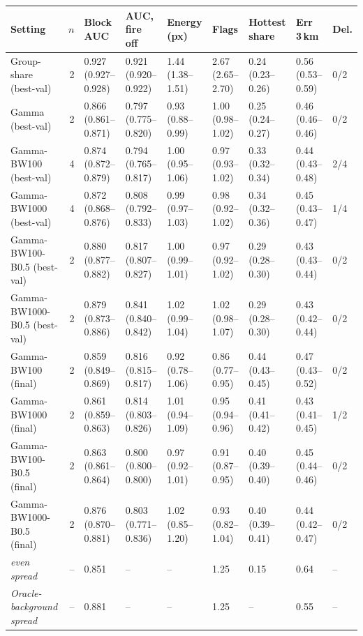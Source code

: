 \begin{tabular}{lrlllllll}
\toprule
Setting & $n$ & Block AUC & AUC, fire off & Energy (px) & Flags & Hottest share & Err 3\,km & Del. \\
\midrule
Group-share (best-val) & 2 & 0.927 (0.927--0.928) & 0.921 (0.920--0.922) & 1.44 (1.38--1.51) & 2.67 (2.65--2.70) & 0.24 (0.23--0.26) & 0.56 (0.53--0.59) & 0/2 \\
Gamma (best-val) & 2 & 0.866 (0.861--0.871) & 0.797 (0.775--0.820) & 0.93 (0.88--0.99) & 1.00 (0.98--1.02) & 0.25 (0.24--0.27) & 0.46 (0.46--0.46) & 0/2 \\
Gamma-BW100 (best-val) & 4 & 0.874 (0.872--0.879) & 0.794 (0.765--0.817) & 1.00 (0.95--1.06) & 0.97 (0.93--1.02) & 0.33 (0.32--0.34) & 0.44 (0.43--0.48) & 2/4 \\
Gamma-BW1000 (best-val) & 4 & 0.872 (0.868--0.876) & 0.808 (0.792--0.833) & 0.99 (0.97--1.03) & 0.98 (0.92--1.02) & 0.34 (0.32--0.36) & 0.45 (0.43--0.47) & 1/4 \\
Gamma-BW100-B0.5 (best-val) & 2 & 0.880 (0.877--0.882) & 0.817 (0.807--0.827) & 1.00 (0.99--1.01) & 0.97 (0.92--1.02) & 0.29 (0.28--0.30) & 0.43 (0.43--0.44) & 0/2 \\
Gamma-BW1000-B0.5 (best-val) & 2 & 0.879 (0.873--0.886) & 0.841 (0.840--0.842) & 1.02 (0.99--1.04) & 1.02 (0.98--1.07) & 0.29 (0.28--0.30) & 0.43 (0.42--0.44) & 0/2 \\
Gamma-BW100 (final) & 2 & 0.859 (0.849--0.869) & 0.816 (0.815--0.817) & 0.92 (0.78--1.06) & 0.86 (0.77--0.95) & 0.44 (0.43--0.45) & 0.47 (0.43--0.52) & 0/2 \\
Gamma-BW1000 (final) & 2 & 0.861 (0.859--0.863) & 0.814 (0.803--0.826) & 1.01 (0.94--1.09) & 0.95 (0.94--0.96) & 0.41 (0.41--0.42) & 0.43 (0.41--0.45) & 1/2 \\
Gamma-BW100-B0.5 (final) & 2 & 0.863 (0.861--0.864) & 0.800 (0.800--0.800) & 0.97 (0.92--1.01) & 0.91 (0.87--0.95) & 0.40 (0.39--0.40) & 0.45 (0.44--0.46) & 0/2 \\
Gamma-BW1000-B0.5 (final) & 2 & 0.876 (0.870--0.881) & 0.803 (0.771--0.836) & 1.02 (0.85--1.20) & 0.93 (0.82--1.04) & 0.40 (0.39--0.41) & 0.44 (0.42--0.47) & 0/2 \\
\midrule
\emph{even spread} & -- & 0.851 & -- & -- & 1.25 & 0.15 & 0.64 & -- \\
\emph{Oracle-background spread} & -- & 0.881 & -- & -- & 1.25 & -- & 0.55 & -- \\
\bottomrule
\end{tabular}
